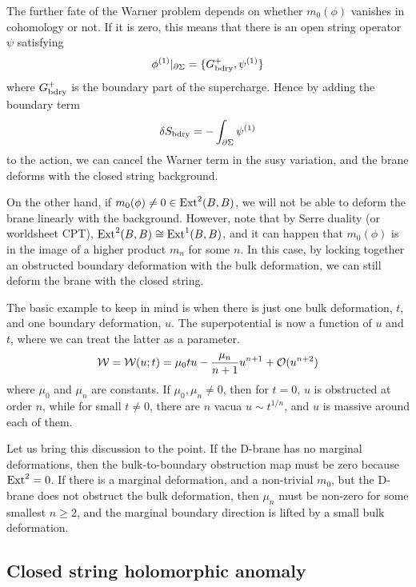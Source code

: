 The further fate of the Warner problem depends on whether $m_0(\phi)$ 
vanishes in cohomology or not. If it is zero, this means that there 
is an open string operator $\psi$ satisfying
\begin{equation}
\eqlabel{cancelwarner}
\phi^{(1)}|_{\del\Sigma} = \{G^+_{\rm bdry},\psi^{(1)}\}
\end{equation}
where $G^+_{\rm bdry}$ is the boundary part of the supercharge. Hence
by adding the boundary term
\begin{equation}
\eqlabel{bodef}
\delta S_{\rm bdry} = -\int_{\del\Sigma} \psi^{(1)}
\end{equation}
to the action, we can cancel the Warner term in the susy variation,
and the brane deforms with the closed string background.

On the other hand, if $m_0(\phi)\neq 0\in {\rm Ext}^2(B,B)$, we will
not be able to deform the brane linearly with the background. However,
note that by Serre duality (or worldsheet CPT), ${\rm Ext}^2(B,B)
\cong {\rm Ext}^1(B,B)$, and it can happen that $m_0(\phi)$ is
in the image of a higher product $m_n$ for some $n$. In this case, 
by locking together an obstructed boundary deformation with the bulk 
deformation, we can still deform the brane with the closed string.

The basic example to keep in mind is when there is just one bulk 
deformation, $t$, and one boundary deformation, $u$. The superpotential 
is now a function of $u$ and $t$, where we can treat the latter as 
a parameter.
\begin{equation}
\eqlabel{generically}
\calw=\calw(u;t) = \mu_0 tu - \frac  {\mu_n} {n+1} {u^{n+1}} + \calo(u^{n+2})
\end{equation}
where $\mu_0$ and $\mu_n$ are constants. If $\mu_0,\mu_n\neq 0$, then for 
$t=0$, $u$ is obstructed at order $n$, while for small $t\neq 0$, there 
are $n$ vacua $u\sim t^{1/n}$, and $u$ is massive around each of them.

Let us bring this discussion to the point. If the D-brane has no marginal 
deformations, then the bulk-to-boundary obstruction map must be zero 
because ${\rm Ext}^2=0$. If there is a marginal deformation, and a 
non-trivial $m_0$, but the D-brane does not obstruct the bulk deformation, 
then $\mu_n$ must be non-zero for some smallest $n\ge 2$, and the marginal 
boundary direction is lifted by a small bulk deformation.


\subsection{Closed string holomorphic anomaly}
\label{cshan}

